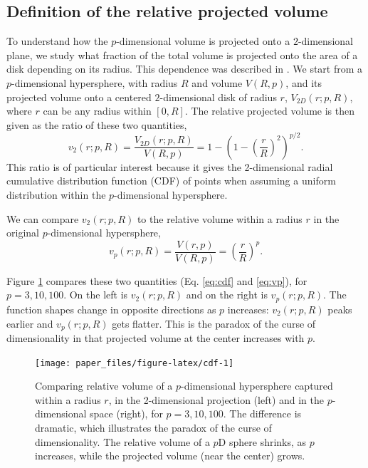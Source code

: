 \documentclass[]{interact}
\theoremstyle{plain}%
\theoremstyle{definition}
\theoremstyle{remark}
\begin{document}
\hypertarget{definition-of-the-relative-projected-volume}{%
\subsection{Definition of the relative projected
volume}\label{definition-of-the-relative-projected-volume}}

To understand how the \(p\)-dimensional volume is projected onto a
\(2\)-dimensional plane, we study what fraction of the total volume is
projected onto the area of a disk depending on its radius. This
dependence was described in \citet{Laa:2020wkm}. We start from a
\(p\)-dimensional hypersphere, with radius \(R\) and volume \(V(R, p)\),
and its projected volume onto a centered \(2\)-dimensional disk of
radius \(r\), \(V_{2D}(r; p, R)\), where \(r\) can be any radius within
\([0, R]\). The relative projected volume is then given as the ratio of
these two quantities, \begin{equation}
v_{2} (r; p, R) = \frac{V_{2D}(r; p, R)}{V(R, p)} = 1 - \left(1-\left(\frac{r}{R}\right)^2\right)^{p/2}.
\label{eq:cdf}
\end{equation} This ratio is of particular interest because it gives the
2-dimensional radial cumulative distribution function (CDF) of points
when assuming a uniform distribution within the \(p\)-dimensional
hypersphere.

We can compare \(v_{2} (r; p, R)\) to the relative volume within a
radius \(r\) in the original \(p\)-dimensional hypersphere,
\begin{equation}
v_{p} (r; p, R) = \frac{V(r, p)}{V(R, p)} = \left({\frac{r}{R}}\right)^p.
\label{eq:vp}
\end{equation}

Figure \ref{fig:cdf} compares these two quantities (Eq. \ref{eq:cdf} and
\ref{eq:vp}), for \(p=3, 10, 100\). On the left is \(v_{2} (r; p, R)\)
and on the right is \(v_{p} (r; p, R)\). The function shapes change in
opposite directions as \(p\) increases: \(v_{2} (r; p, R)\) peaks
earlier and \(v_{p} (r; p, R)\) gets flatter. This is the paradox of the
curse of dimensionality in that projected volume at the center increases
with \(p\).

\begin{figure}

{\centering \texttt{[image: paper\_files/figure-latex/cdf-1]} 

}

\caption{Comparing relative volume of a $p$-dimensional hypersphere captured within a radius $r$, in the 2-dimensional projection (left) and in the $p$-dimensional space (right), for $p=3, 10, 100$. The difference is dramatic, which illustrates the paradox of the curse of dimensionality. The relative volume of a $p$D sphere shrinks, as $p$ increases, while the projected volume (near the center) grows.}\label{fig:cdf}
\end{figure}
\end{document}
